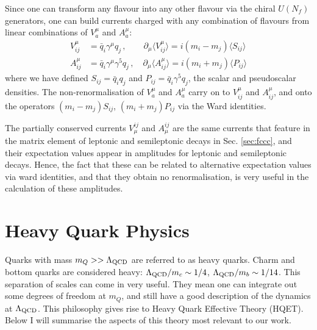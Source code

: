 
Since one can transform any flavour into any other flavour via the chiral $U(N_f)$ generators, one can build currents charged with any combination of flavours from linear combinations of $V_a^{\mu}$ and $A_a^{\mu}$:
\begin{align}
  \label{eq:vector_ward_indiv}
  V_{ij}^{\mu} &= \bar{q}_i \gamma^{\mu} q_j \,,\quad\quad \partial_{\mu}\langle V^{\mu}_{ij} \rangle = i ( m_i - m_j ) \langle S_{ij} \rangle \\
  A_{ij}^{\mu} &= \bar{q}_i \gamma^{\mu}\gamma^5 q_j \,,\quad \partial_{\mu}\langle A^{\mu}_{ij} \rangle = i ( m_i + m_j ) \langle P_{ij} \rangle
  \label{eq:axial_ward_indiv}
\end{align}
where we have defined $S_{ij} = \bar{q}_iq_j$ and $P_{ij} = \bar{q}_i\gamma^5 q_j$, the scalar and pseudoscalar densities. The non-renormalisation of $V_a^{\mu}$ and $A_a^{\mu}$ carry on to $V_{ij}^{\mu}$ and $A_{ij}^{\mu}$, and onto the operators $( m_i - m_j ) S_{ij}$, $( m_i + m_j ) P_{ij}$ via the Ward identities.

The partially conserved currents $V^{ij}_{\mu}$ and $A^{ij}_{\mu}$ are the same currents that feature in the matrix element of leptonic and semileptonic decays in Sec. \ref{sec:fccc}, and their expectation values appear in amplitudes for leptonic and semileptonic decays. Hence, the fact that these can be related to alternative expectation values via ward identities, and that they obtain no renormalisation, is very useful in the calculation of these amplitudes.

\section{Heavy Quark Physics}

Quarks with mass $m_Q >> \Lambda_{\text{QCD}}$ are referred to as heavy quarks. Charm and bottom quarks are considered heavy: $\Lambda_{\text{QCD}}/m_c \sim 1/4$, $\Lambda_{\text{QCD}}/m_b \sim 1/14$. This separation of scales can come in very useful. They mean one can integrate out some degrees of freedom at $m_Q$, and still have a good description of the dynamics at $\Lambda_{\text{QCD}}$. This philosophy gives rise to Heavy Quark Effective Theory (HQET). Below I will summarise the aspects of this theory most relevant to our work.

